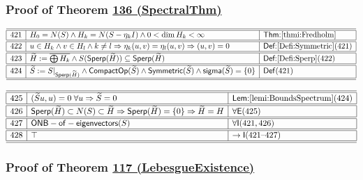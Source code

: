 \documentclass[11pt,reqno]{amsart}
\begin{document}
\medskip

\subsubsection*{Proof of Theorem \hyperlink{thm:SpectralThm}{136 (\textsf{SpectralThm})}}

\noindent$%
\begin{array}{|r|l|l|}
\hline\hline
421 & H_{0}=N(S)\wedge H_{k}=N(S-\eta_{k}I)\wedge0<\dim H_{k}<\infty & \textsf{Thm:}\ref{thmi:Fredholm} \\ \hline\hline
422 & u\in H_{k}\wedge v\in H_{l}\wedge k\neq l\Rightarrow\eta_{k}(u,v)=\eta_{l}(u,v)\Rightarrow(u,v)=0 & \textsf{Def:}\ref{Defi:Symmetric}(421) \\ \hline\hline
423 & \widetilde{H}:=\overline{\bigoplus H_{k}}\wedge S(\mathsf{Sperp}(\widetilde{H}))\subseteq\mathsf{Sperp}(\widetilde{H}) & \textsf{Def:}\ref{Defi:Sperp}(422) \\ \hline\hline
424 & \widetilde{S}:=S|_{\mathsf{Sperp}(\widetilde{H})}\wedge\mathsf{CompactOp}(\widetilde{S})\wedge\mathsf{Symmetric}(\widetilde{S})\wedge\mathsf{sigma}(\widetilde{S})=\{0\} & \mathsf{Def}(421) \\ \hline\hline
\end{array}%
$

\medskip

\noindent$%
\begin{array}{|r|l|l|}
\hline\hline
425 & (\widetilde{S}u,u)=0\;\forall u\Rightarrow\widetilde{S}=0 & \textsf{Lem:}\ref{lemi:BoundsSpectrum}(424) \\ \hline\hline
426 & \mathsf{Sperp}(\widetilde{H})\subset N(S)\subset\widetilde{H}\Rightarrow\mathsf{Sperp}(\widetilde{H})=\{0\}\Rightarrow\widetilde{H}=H & \forall\mathsf{E}(425) \\ \hline\hline
427 & \mathsf{ONB-of-eigenvectors}(S) & \forall\mathsf{I}(421,426) \\ \hline\hline
428 & \top & \to\mathsf{I}(421\text{--}427) \\ \hline\hline
\end{array}%
$

\medskip

\subsubsection*{Proof of Theorem \hyperlink{thm:LebesgueExistence}{117 (\textsf{LebesgueExistence})}}
\end{document}
